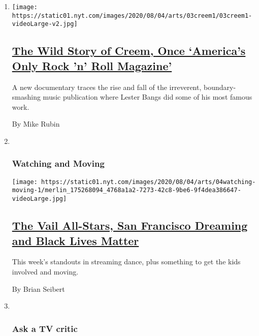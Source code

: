\begin{enumerate}
\def\labelenumi{\arabic{enumi}.}
\item
  \texttt{[image: https://static01.nyt.com/images/2020/08/04/arts/03creem1/03creem1-videoLarge-v2.jpg]}

  \hypertarget{the-wild-story-of-creem-once-americas-only-rock-n-roll-magazine}{%
  \subsection{\texorpdfstring{\href{/2020/08/03/arts/music/creem-magazine-documentary.html}{The
  Wild Story of Creem, Once `America's Only Rock 'n' Roll
  Magazine'}}{The Wild Story of Creem, Once `America's Only Rock 'n' Roll Magazine'}}\label{the-wild-story-of-creem-once-americas-only-rock-n-roll-magazine}}

  A new documentary traces the rise and fall of the irreverent,
  boundary-smashing music publication where Lester Bangs did some of his
  most famous work.

  By Mike Rubin
\item ~
  \hypertarget{watching-and-moving}{%
  \subsubsection{Watching and Moving}\label{watching-and-moving}}

  \texttt{[image: https://static01.nyt.com/images/2020/08/04/arts/04watching-moving-1/merlin\_175268094\_4768a1a2-7273-42c8-9be6-9f4dea386647-videoLarge.jpg]}

  \hypertarget{the-vail-all-stars-san-francisco-dreaming-and-black-lives-matter}{%
  \subsection{\texorpdfstring{\href{/2020/08/04/arts/dance/the-best-in-streaming-dance.html}{The
  Vail All-Stars, San Francisco Dreaming and Black Lives
  Matter}}{The Vail All-Stars, San Francisco Dreaming and Black Lives Matter}}\label{the-vail-all-stars-san-francisco-dreaming-and-black-lives-matter}}

  This week's standouts in streaming dance, plus something to get the
  kids involved and moving.

  By Brian Seibert
\item ~
  \hypertarget{ask-a-tv-critic}{%
  \subsubsection{Ask a TV critic}\label{ask-a-tv-critic}}


\end{enumerate}
